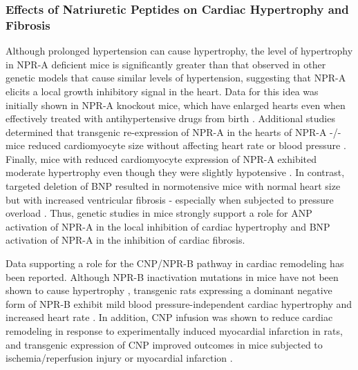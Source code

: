 \documentclass[14pt,a4paper,onecolumn]{extarticle}
\begin{document}
\subsubsection{Effects of Natriuretic Peptides on Cardiac Hypertrophy and Fibrosis}

Although prolonged hypertension can cause hypertrophy, the level of hypertrophy in NPR-A deficient mice is significantly greater than that observed in other genetic models that cause similar levels of hypertension, suggesting that NPR-A elicits a local growth inhibitory signal in the heart. Data for this idea was initially shown in NPR-A knockout mice, which have enlarged hearts even when effectively treated with antihypertensive drugs from birth \citep{Knowles2001}. Additional studies determined that transgenic re-expression of NPR-A in the hearts of NPR-A -/- mice reduced cardiomyocyte size without affecting heart rate or blood pressure \citep{Kishimoto2001}.
Finally, mice with reduced cardiomyocyte expression of NPR-A exhibited moderate hypertrophy even though they were slightly hypotensive \citep{Holtwick2003} \citep{Patel2005}. %
In contrast, targeted deletion of BNP resulted in normotensive mice with normal heart size but with increased ventricular fibrosis - especially when subjected to pressure overload \citep{Tamura2000}. Thus, genetic studies in mice strongly support a role for ANP activation of NPR-A in the local inhibition of cardiac hypertrophy and BNP activation of NPR-A in the inhibition of cardiac fibrosis.

Data supporting a role for the CNP/NPR-B pathway in cardiac remodeling has been reported. Although NPR-B inactivation mutations in mice have not been shown to cause hypertrophy \citep{Tamura2004} \citep{Tsuji2005}, transgenic rats expressing a dominant negative form of NPR-B exhibit mild blood pressure-independent cardiac hypertrophy and increased heart rate \citep{Langenickel2006}.
In addition, CNP infusion was shown to reduce cardiac remodeling in response to experimentally induced myocardial infarction in rats, and transgenic expression of CNP improved outcomes in mice subjected to ischemia/reperfusion injury or myocardial infarction \citep{Wang2007}.
\end{document}

